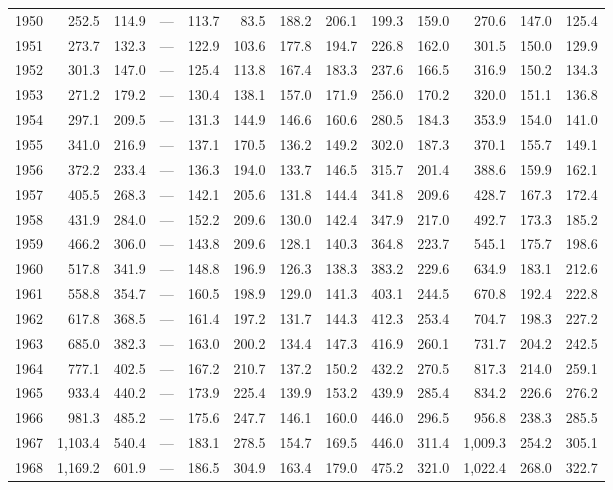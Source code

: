 \begin{longtable}{rrrrrrrrrrrrr}
1950 & 252.5 & 114.9 & --- & 113.7 & 83.5 & 188.2 & 206.1 & 199.3 & 159.0 & 270.6 & 147.0 & 125.4 \\
1951 & 273.7 & 132.3 & --- & 122.9 & 103.6 & 177.8 & 194.7 & 226.8 & 162.0 & 301.5 & 150.0 & 129.9 \\
1952 & 301.3 & 147.0 & --- & 125.4 & 113.8 & 167.4 & 183.3 & 237.6 & 166.5 & 316.9 & 150.2 & 134.3 \\
1953 & 271.2 & 179.2 & --- & 130.4 & 138.1 & 157.0 & 171.9 & 256.0 & 170.2 & 320.0 & 151.1 & 136.8 \\
1954 & 297.1 & 209.5 & --- & 131.3 & 144.9 & 146.6 & 160.6 & 280.5 & 184.3 & 353.9 & 154.0 & 141.0 \\
1955 & 341.0 & 216.9 & --- & 137.1 & 170.5 & 136.2 & 149.2 & 302.0 & 187.3 & 370.1 & 155.7 & 149.1 \\
1956 & 372.2 & 233.4 & --- & 136.3 & 194.0 & 133.7 & 146.5 & 315.7 & 201.4 & 388.6 & 159.9 & 162.1 \\
1957 & 405.5 & 268.3 & --- & 142.1 & 205.6 & 131.8 & 144.4 & 341.8 & 209.6 & 428.7 & 167.3 & 172.4 \\
1958 & 431.9 & 284.0 & --- & 152.2 & 209.6 & 130.0 & 142.4 & 347.9 & 217.0 & 492.7 & 173.3 & 185.2 \\
1959 & 466.2 & 306.0 & --- & 143.8 & 209.6 & 128.1 & 140.3 & 364.8 & 223.7 & 545.1 & 175.7 & 198.6 \\
1960 & 517.8 & 341.9 & --- & 148.8 & 196.9 & 126.3 & 138.3 & 383.2 & 229.6 & 634.9 & 183.1 & 212.6 \\
1961 & 558.8 & 354.7 & --- & 160.5 & 198.9 & 129.0 & 141.3 & 403.1 & 244.5 & 670.8 & 192.4 & 222.8 \\
1962 & 617.8 & 368.5 & --- & 161.4 & 197.2 & 131.7 & 144.3 & 412.3 & 253.4 & 704.7 & 198.3 & 227.2 \\
1963 & 685.0 & 382.3 & --- & 163.0 & 200.2 & 134.4 & 147.3 & 416.9 & 260.1 & 731.7 & 204.2 & 242.5 \\
1964 & 777.1 & 402.5 & --- & 167.2 & 210.7 & 137.2 & 150.2 & 432.2 & 270.5 & 817.3 & 214.0 & 259.1 \\
1965 & 933.4 & 440.2 & --- & 173.9 & 225.4 & 139.9 & 153.2 & 439.9 & 285.4 & 834.2 & 226.6 & 276.2 \\
1966 & 981.3 & 485.2 & --- & 175.6 & 247.7 & 146.1 & 160.0 & 446.0 & 296.5 & 956.8 & 238.3 & 285.5 \\
1967 & 1,103.4 & 540.4 & --- & 183.1 & 278.5 & 154.7 & 169.5 & 446.0 & 311.4 & 1,009.3 & 254.2 & 305.1 \\
1968 & 1,169.2 & 601.9 & --- & 186.5 & 304.9 & 163.4 & 179.0 & 475.2 & 321.0 & 1,022.4 & 268.0 & 322.7 \\

\end{longtable}
